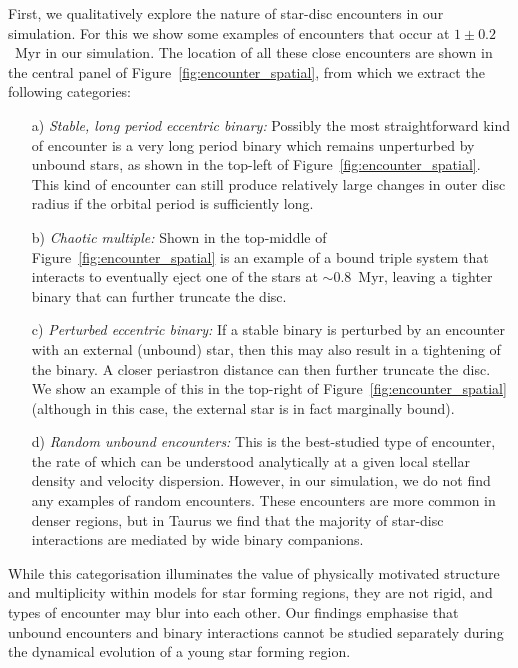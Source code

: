\documentclass{aa}
\begin{document}
First, we qualitatively explore the nature of star-disc encounters in our simulation. For this we show some examples of encounters that occur at $1\pm0.2$~Myr in our simulation. The location of all these close encounters are shown in the central panel of Figure~\ref{fig:encounter_spatial}, from which we extract the following categories:

\begin{itemize}
    \item[a)] \textit{Stable, long period eccentric binary:} Possibly the most straightforward kind of encounter is a very long period binary which remains unperturbed by unbound stars, as shown in the top-left of Figure~\ref{fig:encounter_spatial}. This kind of encounter can still produce relatively large changes in outer disc radius if the orbital period is sufficiently long.
    \item[b)] \textit{Chaotic multiple:} Shown in the top-middle of Figure~\ref{fig:encounter_spatial} is an example of a bound triple system that interacts to eventually eject one of the stars at $\sim 0.8$~Myr, leaving a tighter binary that can further truncate the disc. 
    \item[c)] \textit{Perturbed eccentric binary:} If a stable binary is perturbed by an encounter with an external (unbound) star, then this may also result in a tightening of the binary. A closer periastron distance can then further truncate the disc. We show an example of this in the top-right of Figure~\ref{fig:encounter_spatial} (although in this case, the external star is in fact marginally bound).
    \item[d)] \textit{Random unbound encounters:} This is the best-studied type of encounter, the rate of which can be understood analytically at a given local stellar density and velocity dispersion. However, in our simulation, we do not find any examples of random encounters. These encounters are more common in denser regions, but in Taurus we find that the majority of star-disc interactions are mediated by wide binary companions. 
\end{itemize}

While this categorisation illuminates the value of physically motivated structure and multiplicity within models for star forming regions, they are not rigid, and types of encounter may blur into each other. Our findings emphasise that unbound encounters and binary interactions cannot be studied separately during the dynamical evolution of a young star forming region.  
\end{document}

